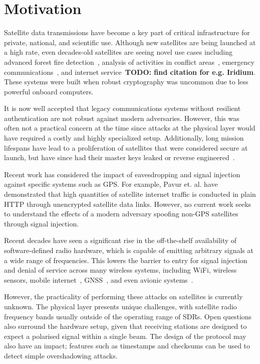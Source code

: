 \section{Motivation}

Satellite data transmissions have become a key part of critical infrastructure for private, national, and scientific use.
Although new satellites are being launched at a high rate, even decades-old satellites are seeing novel use cases including advanced forest fire detection~\cite{nasaFirms}, analysis of activities in conflict areas~\cite{separatistLuminosity}, emergency communications~\cite{apple_emergency_sos}, and internet service~\textbf{TODO: find citation for e.g. Iridium}.
These systems were built when robust cryptography was uncommon due to less powerful onboard computers.

It is now well accepted that legacy communications systems without resilient authentication are not robust against modern adversaries.
However, this was often not a practical concern at the time since attacks at the physical layer would have required a costly and highly specialized setup.
Additionally, long mission lifespans have lead to a proliferation of satellites that were considered secure at launch, but have since had their master keys leaked or reverse engineered~\cite{lrit-key-dec,xrit-rx}.

Recent work has considered the impact of eavesdropping and signal injection against specific systems such as GPS.
For example, Pavur et. al. have demonstrated that high quantities of satellite internet traffic is conducted in plain HTTP through unencrypted satellite data links.  \cite{pavur2020tale}
However, no current work seeks to understand the effects of a modern adversary spoofing non-GPS satellites through signal injection.

Recent decades have seen a significant rise in the off-the-shelf availability of software-defined radio hardware, which is capable of emitting arbitrary signals at a wide range of frequencies.
This lowers the barrier to entry for signal injection and denial of service across many wireless systems, including WiFi, wireless sensors, mobile internet~\cite{yang2019hiding,erni2021adaptover}, GNSS~\cite{tippenhauer2011requirements}, and even avionic systems~\cite{sathayeWireless2019}.

However, the practicality of performing these attacks on satellites is currently unknown.
The physical layer presents unique challenges, with satellite radio frequency bands usually outside of the operating range of SDRs.
Open questions also surround the hardware setup, given that receiving stations are designed to expect a polarised signal within a single beam.
The design of the protocol may also have an impact; features such as timestamps and checksums can be used to detect simple overshadowing attacks.

